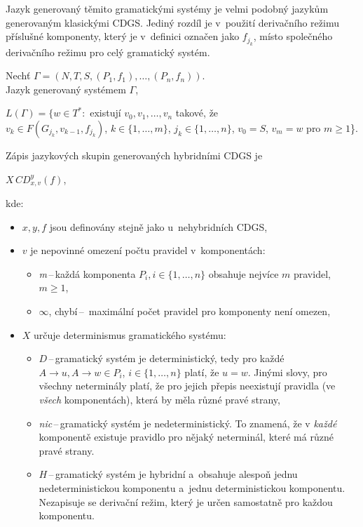 Jazyk generovaný těmito gramatickými systémy je velmi podobný jazykům generovaným klasickými CDGS.
Jediný rozdíl je v~použití derivačního režimu příslušné komponenty, který je v~definici označen jako $f_{j_k}$, místo společného derivačního režimu pro celý gramatický systém.
\begin{definition}
    Nechť $\Gamma = (N, T, S, (P_1, f_1), \ldots, (P_n, f_n))$.\\
    Jazyk generovaný systémem $\Gamma$, 
    \begin{center}
        $L(\Gamma) = \{w \in T^*:$ existují $v_0, v_1,\ldots, v_n$ takové, že \\ $v_k \in F(G_{j_k}, v_{k-1}, f_{j_k})$, $k \in \{1, \ldots, m\}$, $j_k \in \{1, \ldots, n\}$, $v_0 = S$, $v_m = w$ pro $m \geq 1$\}.
    \end{center} 
\end{definition}

Zápis jazykových skupin generovaných hybridními CDGS je
\begin{center}
    $X\,CD^y_{x, v}(f) $, 
\end{center}
kde:
\begin{itemize}
    \item $x, y, f$ jsou definovány stejně jako u~nehybridních CDGS,
    \item $v$ je nepovinné omezení počtu pravidel v~komponentách:
    \begin{itemize}[label=$\circ$]
        \item \emph{m}\,--\,každá komponenta $P_i, i \in \{1, \ldots, n\}$ obsahuje nejvíce $m$ pravidel, $m \geq 1$,
        \item $\infty$, chybí\,--\, maximální počet pravidel pro komponenty není omezen,
    \end{itemize}
    \item $X$ určuje determinismus gramatického systému:
    \begin{itemize}[label=$\circ$]
        \item $D$\,--\,gramatický systém je deterministický, tedy pro každé $A \rightarrow u, A \rightarrow w \in P_i$, $i \in \{1, \ldots, n\}$ platí, že $u = w$.
        Jinými slovy, pro všechny neterminály platí, že pro jejich přepis neexistují pravidla (ve \emph{všech} komponentách), která by měla různé pravé strany,
        \item \emph{nic}\,--\,gramatický systém je nedeterministický.
        To znamená, že v \emph{každé} komponentě existuje pravidlo pro nějaký neterminál, které má různé pravé strany.
        \item $H$\,--\,gramatický systém je hybridní a~obsahuje alespoň jednu nedeterministickou komponentu a~jednu deterministickou komponentu.
        Nezapisuje se derivační režim, který je určen samostatně pro každou komponentu. 
    \end{itemize}
\end{itemize}

